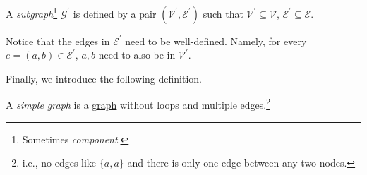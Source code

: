 \begin{definition}[Subgraph]\label{def:subgraph}
	A \emph{subgraph}\footnote{Sometimes \emph{component}.} \(\mathcal{G}^\prime\) is defined by a pair \((\mathcal{V}^\prime, \mathcal{E}^\prime)\) such that \(\mathcal{V}^\prime \subseteq \mathcal{V}\), \(\mathcal{E}^\prime\subseteq\mathcal{E}\).
\end{definition}

\begin{note}
	Notice that the edges in \(\mathcal{E}^\prime\) need to be well-defined. Namely, for every \(e = (a,b) \in\mathcal{E}^\prime\), \(a, b\) need to also be in \(\mathcal{V}^\prime\).
\end{note}

Finally, we introduce the following definition.
\begin{definition}\label{def:simple-graph}
	A \emph{simple graph} is a \hyperref[def:graph]{graph} without loops and multiple edges.\footnote{i.e., no edges like \(\{a, a\}\) and there is only one edge between any two nodes.}
\end{definition}